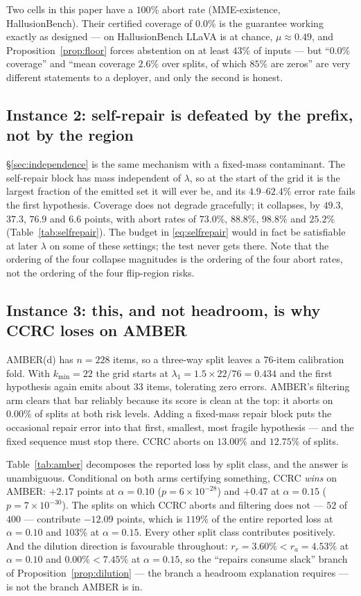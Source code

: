 \documentclass[review,number,doubleblind]{elsarticle}
\theoremstyle{plain}
\theoremstyle{definition}
\theoremstyle{remark}
\begin{document}
Two cells in this paper have a $100\%$ abort rate (MME-existence, HallusionBench). Their
certified coverage of $0.0\%$ is the guarantee working exactly as designed --- on HallusionBench
LLaVA is at chance, $\mu\approx0.49$, and Proposition~\ref{prop:floor} forces abstention on at
least $43\%$ of inputs --- but ``$0.0\%$ coverage'' and ``mean coverage $2.6\%$ over splits, of
which $85\%$ are zeros'' are very different statements to a deployer, and only the second is
honest.

\subsection{Instance 2: self-repair is defeated by the prefix, not by the region}

\S\ref{sec:independence} is the same mechanism with a fixed-mass contaminant. The self-repair
block has mass independent of $\lambda$, so at the start of the grid it is the largest fraction
of the emitted set it will ever be, and its $4.9$--$62.4\%$ error rate fails the first hypothesis.
Coverage does not degrade gracefully; it collapses, by $49.3$, $37.3$, $76.9$ and $6.6$ points,
with abort rates of $73.0\%$, $88.8\%$, $98.8\%$ and $25.2\%$ (Table~\ref{tab:selfrepair}). The
budget in \eqref{eq:selfrepair} would in fact be satisfiable at later $\lambda$ on some of these
settings; the test never gets there. Note that the ordering of the four collapse magnitudes is
the ordering of the four abort rates, not the ordering of the four flip-region risks.

\subsection{Instance 3: this, and not headroom, is why CCRC loses on AMBER}

AMBER(d) has $n=228$ items, so a three-way split leaves a $76$-item calibration fold. With
$k_{\min}=22$ the grid starts at $\lambda_1=1.5\times22/76=0.434$ and the first hypothesis again
emits about $33$ items, tolerating zero errors. AMBER's filtering arm clears that bar reliably
because its score is clean at the top: it aborts on $0.00\%$ of splits at both risk levels.
Adding a fixed-mass repair block puts the occasional repair error into that first, smallest,
most fragile hypothesis --- and the fixed sequence must stop there. CCRC aborts on $13.00\%$ and
$12.75\%$ of splits.

Table~\ref{tab:amber} decomposes the reported loss by split class, and the answer is unambiguous.
Conditional on both arms certifying something, CCRC \emph{wins} on AMBER: $+2.17$ points at
$\alpha=0.10$ ($p=6\times10^{-28}$) and $+0.47$ at $\alpha=0.15$ ($p=7\times10^{-30}$). The
splits on which CCRC aborts and filtering does not --- $52$ of $400$ --- contribute $-12.09$
points, which is $119\%$ of the entire reported loss at $\alpha=0.10$ and $103\%$ at
$\alpha=0.15$. Every other split class contributes positively. And the dilution direction is
favourable throughout: $r_r=3.60\%<r_a=4.53\%$ at $\alpha=0.10$ and $0.00\%<7.45\%$ at
$\alpha=0.15$, so the ``repairs consume slack'' branch of Proposition~\ref{prop:dilution} ---
the branch a headroom explanation requires --- is not the branch AMBER is in.
\end{document}
